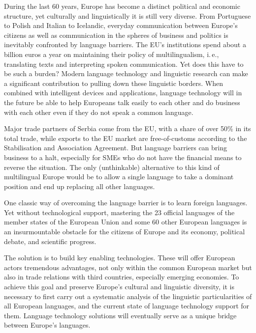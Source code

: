 \begin{multicols}{2}

    
During the last 60 years, Europe has become a distinct political and economic structure, yet culturally and linguistically it is still very diverse. From Portuguese to Polish and Italian to Icelandic, everyday communication between Europe’s citizens as well as communication in the spheres of business and politics is inevitably confronted by language barriers. 
The EU’s institutions spend about a billion euros a year on maintaining their policy of multilingualism, i.\,e., translating texts and interpreting spoken communication. Yet does this have to be such a burden? Modern language technology and linguistic research can make a significant contribution to pulling down these linguistic borders. When combined with intelligent devices and applications, language technology will in the future be able to help Europeans talk easily to each other and do business with each other even if they do not speak a common language. 


Major trade partners of Serbia come from the EU, with a share of over 50\% in its total trade, while exports to the EU market are free-of-customs according to the Stabilisation and Association Agreement. But language barriers can bring business to a halt, especially for SMEs who do not have the financial means to reverse the situation. The only (unthinkable) alternative to this kind of multilingual Europe would be to allow a single language to take a dominant position and end up replacing all other languages. 

One classic way of overcoming the language barrier is to learn foreign languages. Yet without technological support, mastering the 23 official languages of the member states of the European Union and some 60 other European languages is an insurmountable obstacle for the citizens of Europe and its economy, political debate, and scientific progress.   

The solution is to build key enabling technologies. These will offer European actors tremendous advantages, not only within the common European market but also in trade relations with third countries, especially emerging economies.  To achieve this goal and preserve Europe’s cultural and linguistic diversity, it is necessary to first carry out a systematic analysis of the linguistic particularities of all European languages, and the current state of language technology support for them. Language technology solutions will eventually serve as a unique bridge between Europe’s languages. 


\end{multicols}
